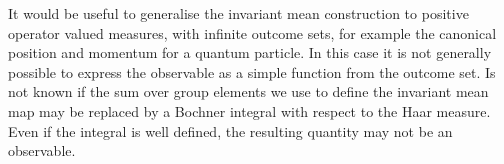 It would be useful to generalise the invariant mean construction to positive operator valued measures, with infinite outcome sets, for example the canonical position and momentum for a quantum particle. In this case it is not generally possible to express the observable as a simple function from the outcome set. Is not known if the sum over group elements we use to define the invariant mean map may be replaced by a Bochner integral with respect to the Haar measure. Even if the integral is well defined, the resulting quantity may not be an observable.